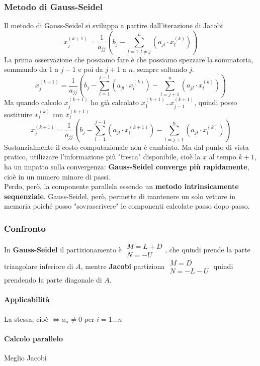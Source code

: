 \documentclass[10pt]{book}
\begin{document}
\subsubsection{Metodo di Gauss-Seidel}
Il metodo di Gauss-Seidel si sviluppa a partire dall'iterazione di Jacobi
$$x_j^{(k+1)} = \frac{1}{a_{jj}} \left(b_j - \sum_{l = 1, l\neq j}^n \left(a_{jl}\cdot x^{(k)}_l\right)\right)$$
La prima osservazione che possiamo fare è che possiamo spezzare la sommatoria, sommando da $1$ a $j-1$ e poi da $j+1$ a $n$, sempre saltando $j$.
$$x_j^{(k+1)} = \frac{1}{a_{jj}} \left(b_j - \sum_{l = 1}^{j-1} \left(a_{jl}\cdot x^{(k)}_l\right) - \sum_{l = j + 1}^{n} \left(a_{jl}\cdot x^{(k)}_l\right)\right)$$
Ma quando calcolo $x_j^{(k+1)}$ ho già calcolato $x_1^{(k+1)}$\ldots$x_{j-1}^{(k+1)}$, quindi posso sostituire $x_l^{(k)}$ con $x_l^{(k+1)}$
$$x_j^{(k+1)} = \frac{1}{a_{jj}} \left(b_j - \sum_{l = 1}^{j-1} \left(a_{jl}\cdot x^{(k+1)}_l\right) - \sum_{l = j + 1}^{n} \left(a_{jl}\cdot x^{(k)}_l\right)\right)$$
Sostanzialmente il costo computazionale non è cambiato. Ma dal punto di vista pratico, utilizzare l'informazione più "fresca" disponibile, cioè la $x$ al tempo $k+1$, ha un impatto sulla convergenza: \textbf{Gauss-Seidel converge più rapidamente}, cioè in un numero minore di passi.\\
Perdo, però, la componente parallela essendo un \textbf{metodo intrinsicamente sequenziale}. Gauss-Seidel, però, permette di mantenere un solo vettore in memoria poiché posso "sovrascrivere" le componenti calcolate passo dopo passo.
\subsubsection{Confronto}
In \textbf{Gauss-Seidel} il partizionamento è $\begin{array}{l}
M = L + D\\N = -U
\end{array}$, che quindi prende la parte triangolare inferiore di $A$, mentre \textbf{Jacobi} partiziona $\begin{array}{l}
M = D\\N = -L-U
\end{array}$ quindi prendendo la parte diagonale di $A$. 
\paragraph{Applicabilità} La stessa, cioè $\Leftrightarrow a_{ii} \neq 0$ per $i = 1\ldots n$
\paragraph{Calcolo parallelo} Meglio Jacobi
\end{document}
